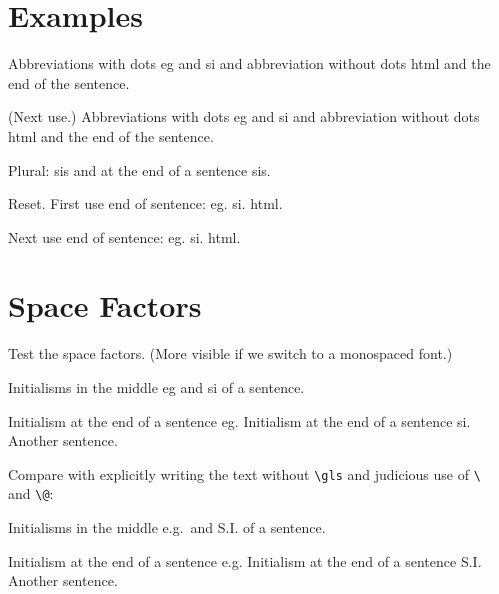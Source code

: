 \documentclass{article}
\begin{document}
\section{Examples}

Abbreviations with dots \gls{eg} and \gls{si} and abbreviation
without dots \gls{html} and the end of the sentence. 

(Next use.) Abbreviations with dots \gls{eg} and \gls{si} and abbreviation
without dots \gls{html} and the end of the sentence. 

Plural: \glspl{si} and at the end of a sentence \glspl{si}.

Reset\glsresetall. First use end of sentence:
\gls{eg}. \gls{si}. \gls{html}.

Next use end of sentence:
\gls{eg}. \gls{si}. \gls{html}.

\section{Space Factors}

Test the space factors. (More visible if we switch to a monospaced
font.)

\begin{ttfamily}
Initialisms in the middle \gls{eg} and \gls{si} of a sentence.

Initialism at the end of a sentence \gls{eg}.
Initialism at the end of a sentence \gls{si}.
Another sentence.
\end{ttfamily}

Compare with explicitly writing the text without \verb|\gls|
and judicious use of \verb*|\ | and \verb|\@|:

\begin{ttfamily}
Initialisms in the middle e.g.\ and S.I. of a sentence.

Initialism at the end of a sentence e.g.
Initialism at the end of a sentence S.I\@.
Another sentence.
\end{ttfamily}

\printglossaries
\end{document}
